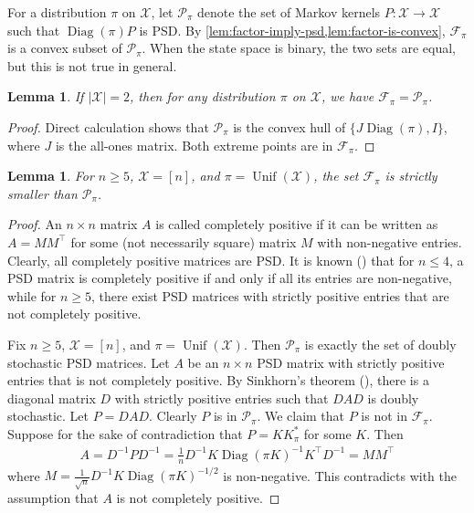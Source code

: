 \documentclass[11pt]{article}
\def\cF{\mathcal{F}}
\def\cP{\mathcal{P}}
\def\cX{\mathcal{X}}
\DeclareMathOperator\Diag{\mathrm{Diag}}
\DeclareMathOperator\Unif{\mathrm{Unif}}
\newtheorem{lemma}[theorem]{Lemma}
\theoremstyle{definition}
\begin{document}
For a distribution $\pi$ on $\cX$, let $\cP_\pi$ denote the set of Markov kernels $P: \cX \to \cX$ such that $\Diag(\pi) P$ is PSD.
By \cref{lem:factor-imply-psd,lem:factor-is-convex}, $\cF_\pi$ is a convex subset of $\cP_\pi$.
When the state space is binary, the two sets are equal, but this is not true in general.
\begin{lemma}
  If $|\cX|=2$, then for any distribution $\pi$ on $\cX$, we have $\cF_\pi=\cP_\pi$.
\end{lemma}
\begin{proof}
  Direct calculation shows that $\cP_\pi$ is the convex hull of
  $\{J \Diag(\pi), I\}$, where $J$ is the all-ones matrix.
  Both extreme points are in $\cF_\pi$.
\end{proof}
\begin{lemma}
  For $n\ge 5$, $\cX=[n]$, and $\pi = \Unif(\cX)$, the set $\cF_\pi$ is strictly smaller than $\cP_\pi$.
\end{lemma}
\begin{proof}
  An $n\times n$ matrix $A$ is called completely positive if it can be written as $A=MM^\top$ for some (not necessarily square) matrix $M$ with non-negative entries.
  Clearly, all completely positive matrices are PSD.
  It is known (\cite{maxfield1962matrix,berman2003completely}) that for $n\le 4$, a PSD matrix is completely positive if and only if all its entries are non-negative, while for $n\ge 5$, there exist PSD matrices with strictly positive entries that are not completely positive.

  Fix $n\ge 5$, $\cX=[n]$, and $\pi=\Unif(\cX)$.
  Then $\cP_\pi$ is exactly the set of doubly stochastic PSD matrices.
  Let $A$ be an $n\times n$ PSD matrix with strictly positive entries that is not completely positive.
  By Sinkhorn's theorem (\cite{marcus1961permanent,sinkhorn1964relationship}), there is a diagonal matrix $D$ with strictly positive entries such that $DAD$ is doubly stochastic.
  Let $P=DAD$. Clearly $P$ is in $\cP_\pi$. We claim that $P$ is not in $\cF_\pi$.
  Suppose for the sake of contradiction that $P=KK_\pi^*$ for some $K$.
  Then
  \begin{align}
    A = D^{-1} P D^{-1} = \frac 1n D^{-1} K \Diag(\pi K)^{-1} K^\top D^{-1} = MM^\top
  \end{align}
  where $M=\frac 1{\sqrt n} D^{-1} K \Diag(\pi K)^{-1/2}$ is non-negative.
  This contradicts with the assumption that $A$ is not completely positive.
\end{proof}
\end{document}
